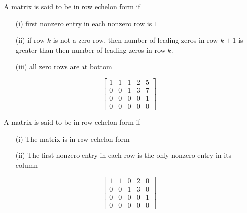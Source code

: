 \begin{tcolorbox}[colback=yellow!10!,colframe=gray!15!]
\begin{definition}
A matrix is said to be in row echelon form if
\begin{itemize}
	\item[(i)] first nonzero entry in each nonzero row is $1$
	\item[(ii)] if row $k$ is not a zero row, then number of leading zeros in row $k+1$ is greater than then number of leading zeros in row $k$.  
	\item[(iii)] all zero rows are at bottom
\end{itemize}
\end{definition}	 
\end{tcolorbox} 


\begin{example}
\[ 
 \begin{bmatrix} 
1& 1 & 1	& 2 & 5 \\
 0 & 0 & 1 & 3 & 7 \\
  0 & 0 & 0 & 0 & 1\\
    0 & 0 & 0 & 0 & 0
    \end{bmatrix} 
 \]
\end{example}














\begin{tcolorbox}[colback=yellow!10!,colframe=gray!15!]
\begin{definition}
A matrix is said to be in row echelon form if
\begin{itemize}
	\item[(i)] The matrix is in row echelon form
	\item[(ii)] The first nonzero entry in each row is the only nonzero entry in its column
\end{itemize}
\end{definition}	 
\end{tcolorbox} 


\begin{example}
\[ 
 \begin{bmatrix} 
1& 1 & 0	& 2 & 0 \\
 0 & 0 & 1 & 3 & 0 \\
  0 & 0 & 0 & 0 & 1\\
    0 & 0 & 0 & 0 & 0
    \end{bmatrix} 
 \]
\end{example}




